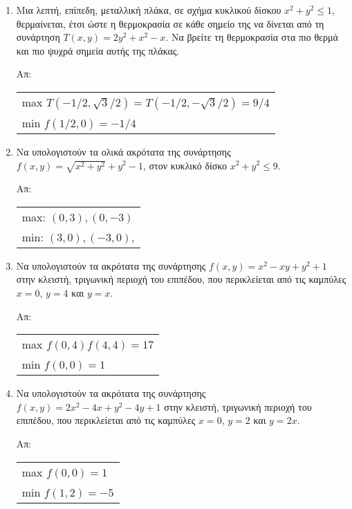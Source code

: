 \begin{enumerate}
  \item Μια λεπτή, επίπεδη, μεταλλική πλάκα, σε σχήμα κυκλικού δίσκου 
    $ x^{2}+y^2 \leq 1 $, θερμαίνεται, έτσι ώστε η θερμοκρασία σε κάθε σημείο της να 
    δίνεται από τη συνάρτηση 
    $ T(x,y) = 2y^{2}+x^{2}-x $.
    Να βρείτε τη θερμοκρασία στα πιο θερμά και πιο ψυχρά σημεία αυτής της πλάκας.

    \hfill Απ:  
    \begin{tabular}{l}
      max $ T(-1/2, \sqrt{3} /2) = T(-1/2, - \sqrt{3} /2) = 9/4 $ \\
      min $ f(1/2,0) = -1/4 $ 
    \end{tabular}

  \item Να υπολογιστούν τα ολικά ακρότατα της συνάρτησης $ f(x,y) = \sqrt{x^{2}+y^{2}} +
    y^{2}-1 $, στον κυκλικό δίσκο $ x^{2}+y^{2} \leq 9 $. 

    \hfill Απ: 
    \begin{tabular}{l}
      max: $ (0,3), (0,-3) $ \\
      min: $ (3,0), (-3,0) $, 
    \end{tabular}

  \item Να υπολογιστούν τα ακρότατα της συνάρτησης $ f(x,y) = x^{2}-xy+y^{2}+1 $ 
    στην κλειστή, τριγωνική περιοχή του επιπέδου, που περικλείεται από τις καμπύλες 
    $ x=0 $, $ y=4 $ και $ y=x $.

    \hfill Απ:  
    \begin{tabular}{l}
      max $ f(0,4) f(4,4) = 17 $ \\
      min $ f(0,0) = 1 $ 
    \end{tabular}

  \item Να υπολογιστούν τα ακρότατα της συνάρτησης $ f(x,y) = 2x^{2}-4x+y^{2}-4y+1 $ 
    στην κλειστή, τριγωνική περιοχή του επιπέδου, που περικλείεται από τις καμπύλες 
    $ x=0 $, $ y=2 $ και $ y=2x $.

    \hfill Απ:  
    \begin{tabular}{l}
      max $ f(0,0) = 1 $ \\
      min $ f(1,2) = -5 $ 
    \end{tabular}
\end{enumerate}






